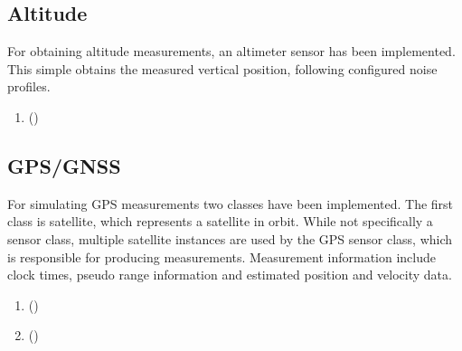 \documentclass[letterpaper,10pt,english]{sphinxmanual}
\begin{document}
\subsection{Altitude}
\label{\detokenize{usage/measurement:altitude}}
\sphinxAtStartPar
For obtaining altitude measurements, an altimeter sensor has been implemented. This simple obtains the measured
vertical position, following configured noise profiles.
\begin{enumerate}
%
\item {} 
\sphinxAtStartPar
{\hyperref[\detokenize{modules/measurement/altimeter:altimeter-py}]{}} ()

\end{enumerate}


\subsection{GPS/GNSS}
\label{\detokenize{usage/measurement:gps-gnss}}
\sphinxAtStartPar
For simulating GPS measurements two classes have been implemented. The first class is satellite, which represents a
satellite in orbit. While not specifically a sensor class, multiple satellite instances are used by the GPS sensor
class, which is responsible for producing measurements. Measurement information include clock times, pseudo range
information and estimated position and velocity data.
\begin{enumerate}
%
\item {} 
\sphinxAtStartPar
{\hyperref[\detokenize{modules/gps/satellite:satellite-py}]{}} ()

\item {} 
\sphinxAtStartPar
{\hyperref[\detokenize{modules/gps/sensor:gps-sensor-py}]{}} ()

\end{enumerate}
\end{document}
